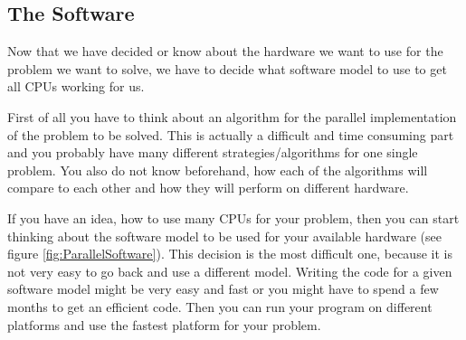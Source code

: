 \subsection{The Software}
Now that we have decided or know about the hardware we want to use
for the problem we want to solve, we have to decide what software
model to use to get all CPUs working for us.  


First of all you have to think about an algorithm for the parallel
implementation of the problem to be solved. This is actually a 
difficult and time consuming part and you probably have many different
strategies/algorithms for one single problem. 
You also do not know beforehand, how
each of the algorithms will compare to each other and 
how they will perform on different hardware.

If you have an idea, how to use many CPUs for your problem, then you can
start thinking about the software model to be used for your available hardware
(see figure \ref{fig:ParallelSoftware}).
This decision is the most difficult one, because it is not very easy
to go back and use a different model. Writing the code 
for a given software model might be very easy and fast or you might have to
spend a few months to get an efficient code. Then you can run your program
on different platforms and use the fastest platform for your problem.

